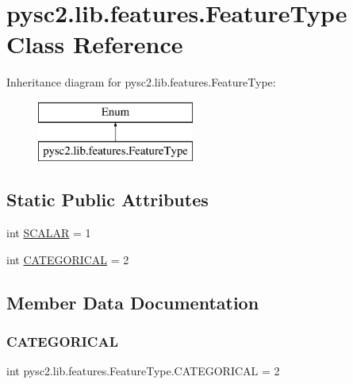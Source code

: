 \hypertarget{classpysc2_1_1lib_1_1features_1_1_feature_type}{}\section{pysc2.\+lib.\+features.\+Feature\+Type Class Reference}
\label{classpysc2_1_1lib_1_1features_1_1_feature_type}
Inheritance diagram for pysc2.\+lib.\+features.\+Feature\+Type\+:\begin{figure}[H]
\begin{center}
\leavevmode
\includegraphics[height=2.000000cm]{classpysc2_1_1lib_1_1features_1_1_feature_type}
\end{center}
\end{figure}
\subsection*{Static Public Attributes}
\begin{DoxyCompactItemize}
\item 
int \mbox{\hyperlink{classpysc2_1_1lib_1_1features_1_1_feature_type_a337be9da5251eee1cade6521de9aae6b}{S\+C\+A\+L\+AR}} = 1
\item 
int \mbox{\hyperlink{classpysc2_1_1lib_1_1features_1_1_feature_type_a8949fad00934fe5c01fc1fe471160919}{C\+A\+T\+E\+G\+O\+R\+I\+C\+AL}} = 2
\end{DoxyCompactItemize}


\subsection{Member Data Documentation}
\mbox{\label{classpysc2_1_1lib_1_1features_1_1_feature_type_a8949fad00934fe5c01fc1fe471160919}} 
\subsubsection{\texorpdfstring{C\+A\+T\+E\+G\+O\+R\+I\+C\+AL}{CATEGORICAL}}
{\footnotesize\ttfamily int pysc2.\+lib.\+features.\+Feature\+Type.\+C\+A\+T\+E\+G\+O\+R\+I\+C\+AL = 2\hspace{0.3cm}{\ttfamily [static]}}

